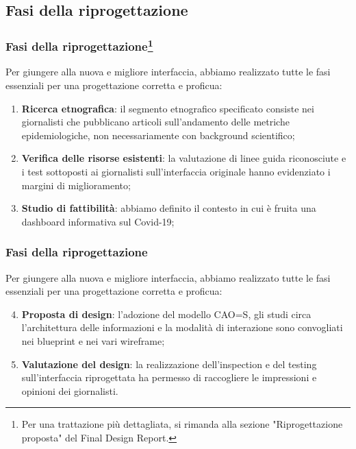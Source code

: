 
\subsection{Fasi della riprogettazione}

\begin{frame}
    \frametitle{Fasi della riprogettazione\footnote{Per una trattazione più dettagliata, si rimanda alla sezione "Riprogettazione proposta" del Final Design Report.}}
    Per giungere alla nuova e migliore interfaccia, abbiamo realizzato tutte le fasi essenziali per una progettazione corretta e proficua:
    \begin{enumerate}
        \item<1-> \textbf{Ricerca etnografica}: il segmento etnografico specificato consiste nei giornalisti che pubblicano articoli sull'andamento delle metriche epidemiologiche, non necessariamente con background scientifico;
        \item<2-> \textbf{Verifica delle risorse esistenti}: la valutazione di linee guida riconosciute e i test sottoposti ai giornalisti sull'interfaccia originale hanno evidenziato i margini di miglioramento;
        \item<3->  \textbf{Studio di fattibilità}: abbiamo definito il contesto in cui è fruita una dashboard informativa sul Covid-19;
    \end{enumerate}  

\end{frame}

\begin{frame}
    \frametitle{Fasi della riprogettazione}
    Per giungere alla nuova e migliore interfaccia, abbiamo realizzato tutte le fasi essenziali per una progettazione corretta e proficua: 
    \begin{enumerate}
        \setcounter{enumi}{3}
        \item<1-> \textbf{Proposta di design}: l'adozione del modello CAO=S, gli studi circa l'architettura delle informazioni e la modalità di interazione sono convogliati nei blueprint e nei vari wireframe;
        \item<2-> \textbf{Valutazione del design}: la realizzazione dell'inspection e del testing sull'interfaccia riprogettata ha permesso di raccogliere le impressioni e opinioni dei giornalisti.
    \end{enumerate}  

\end{frame}